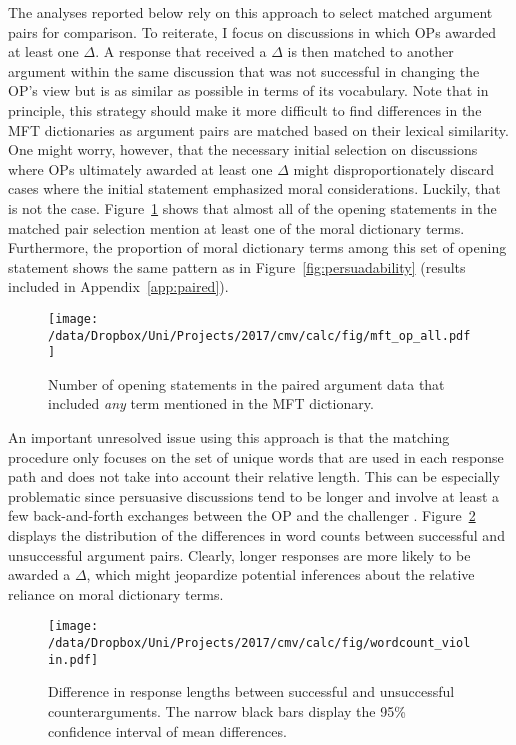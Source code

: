 The analyses reported below rely on this approach to select matched argument pairs for comparison. To reiterate, I focus on discussions in which OPs awarded at least one $\Delta$. A response that received a $\Delta$ is then matched to another argument within the same discussion that was not successful in changing the OP's view but is as similar as possible in terms of its vocabulary. Note that in principle, this strategy should make it more difficult to find differences in the MFT dictionaries as argument pairs are matched based on their lexical similarity. One might worry, however, that the necessary initial selection on discussions where OPs ultimately awarded at least one $\Delta$ might disproportionately discard cases where the initial statement emphasized moral considerations. Luckily, that is not the case. Figure~\ref{fig:mft_op_all} shows that almost all of the opening statements in the matched pair selection mention at least one of the moral dictionary terms. Furthermore, the proportion of moral dictionary terms among this set of opening statement shows the same pattern as in Figure~\ref{fig:persuadability} (results included in Appendix~\ref{app:paired}).

\begin{figure}[ht]
\centering
\texttt{[image: /data/Dropbox/Uni/Projects/2017/cmv/calc/fig/mft\_op\_all.pdf]}
\caption[Number of opening statements in the paired argument data that included \textit{any} term mentioned in the MFT dictionary]{Number of opening statements in the paired argument data that included \textit{any} term mentioned in the MFT dictionary.}\label{fig:mft_op_all}
\end{figure}

An important unresolved issue using this approach is that the matching procedure only focuses on the set of unique words that are used in each response path and does not take into account their relative length. This can be especially problematic since persuasive discussions tend to be longer and involve at least a few back-and-forth exchanges between the OP and the challenger \citep[c.f.,][616]{tan2016winning}. Figure~\ref{fig:wordcount_violin} displays the distribution of the differences in word counts between successful and unsuccessful argument pairs. Clearly, longer responses are more likely to be awarded a $\Delta$, which might jeopardize potential inferences about the relative reliance on moral dictionary terms.

\begin{figure}[ht]
\centering
\texttt{[image: /data/Dropbox/Uni/Projects/2017/cmv/calc/fig/wordcount\_violin.pdf]}
\caption[Difference in response lengths between successful and unsuccessful counterarguments]{Difference in response lengths between successful and unsuccessful counterarguments. The narrow black bars display the 95\% confidence interval of mean differences.}\label{fig:wordcount_violin}
\end{figure}

